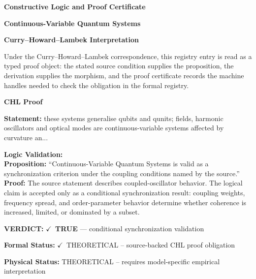 \clearpage
\begingroup\tzpsupportsetup
\noindent\textbf{\fontsize{10.8pt}{12.8pt}\selectfont [ID 0072] Constructive Logic and Proof Certificate}\par
\noindent\textbf{\fontsize{10pt}{12pt}\selectfont Continuous-Variable Quantum Systems}\par
\vspace{0.45em}
\begingroup
\footnotesize
\setlength{\parskip}{0.22em}
\setlength{\parindent}{0pt}
\noindent\textbf{Curry--Howard--Lambek Interpretation}\par
Under the Curry--Howard--Lambek correspondence, this registry entry is read as a typed proof
object: the stated source condition supplies the proposition, the derivation supplies the
morphism, and the proof certificate records the machine handles needed to check the obligation
in the formal registry.

\vspace{0.45em}
\noindent\textbf{CHL Proof}\par
\textbf{Statement:} these systems generalise qubits and qunits; fields, harmonic oscillators and optical
modes are continuous-variable systems affected by curvature an...

\textbf{Logic Validation:}\\
\textbf{Proposition:} ``Continuous-Variable Quantum Systems is valid as a synchronization criterion under the
coupling conditions named by the source.''\\
\textbf{Proof:} The source statement describes coupled-oscillator behavior. The logical claim is
accepted only as a conditional synchronization result: coupling weights, frequency
spread, and order-parameter behavior determine whether coherence is increased, limited,
or dominated by a subset.

\textbf{VERDICT:} \ensuremath{\checkmark}\ \textbf{TRUE} --- conditional synchronization validation

\textbf{Formal Status:} \ensuremath{\checkmark}\ THEORETICAL -- source-backed CHL proof obligation

\textbf{Physical Status:} THEORETICAL -- requires model-specific empirical interpretation
\par\vspace{0.45em}
\par
\ifTZPDarkEdition
{}
\fi
\endgroup
\endgroup
